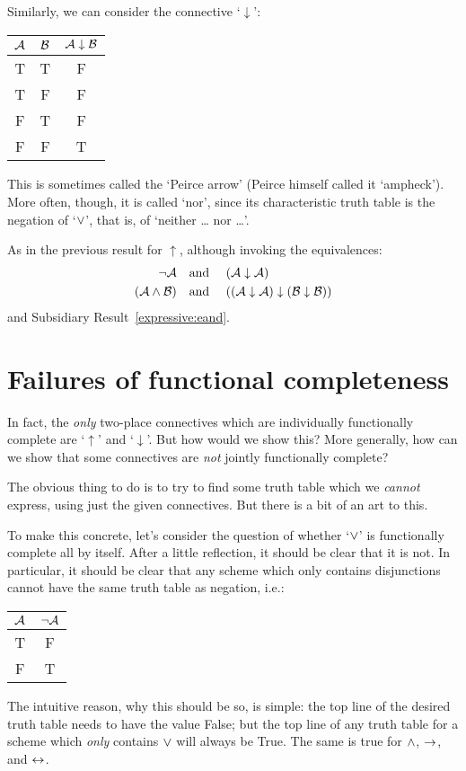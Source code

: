 Similarly, we can consider the connective `$\downarrow$':
\begin{center}
\begin{tabular}{c c | c}
$\mathcal{A}$ & $\mathcal{B}$ & $\mathcal{A} \mathrel{\downarrow} \mathcal{B}$\\
\hline
 T & T & F \\
 T & F & F  \\
 F & T & F  \\
 F & F & T
\end{tabular}
\end{center}
This is sometimes called the `Peirce arrow' (Peirce himself called it `ampheck'). More often, though, it is called `nor', since its characteristic truth table is the negation of `$\vee$', that is, of `neither \dots{} nor \dots'.

As in the previous result for $\uparrow$, although invoking the equivalences:
		\begin{align*}
			\neg \mathcal{A} &\text{\quad and \quad} (\mathcal{A} \downarrow \mathcal{A})\\
			(\mathcal{A} \wedge \mathcal{B}) & \text{\quad and \quad} ((\mathcal{A} \downarrow \mathcal{A}) \downarrow (\mathcal{B} \downarrow \mathcal{B}))
		\end{align*}
and Subsidiary Result~\ref{expressive:eand}.


\section{Failures of functional completeness}

In fact, the \emph{only} two-place connectives which are individually functionally complete are `$\uparrow$' and `$\downarrow$'. But how would we show this? More generally, how can we show that some connectives are \emph{not} jointly functionally complete? 
 
The obvious thing to do is to try to find some truth table which we \emph{cannot} express, using just the given connectives. But there is a bit of an art to this.

To make this concrete, let's consider the question of whether `$\vee$' is functionally complete all by itself. After a little reflection, it should be clear that it is not. In particular, it should be clear that any scheme which only contains disjunctions cannot have the same truth table as negation, i.e.:
				\begin{center}
				\begin{tabular}{c | c}
				$\mathcal{A}$ & $\neg \mathcal{A}$\\
				\hline
				 T & F \\
				 F & T
				\end{tabular}
				\end{center}
The intuitive reason, why this should be so, is simple: the top line of the desired truth table needs to have the value False; but the top line of any truth table for a scheme which \emph{only} contains $\vee$ will always be True. The same is true for $\wedge$, $\rightarrow$, and $\leftrightarrow$.

